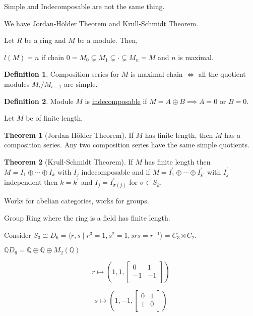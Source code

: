 \documentclass{article}
\theoremstyle{definition}
\newtheorem*{definition}{Definition}
\newtheorem{theorem}{Theorem}
\begin{document}
Simple and Indecomposable are not the same thing.

We have \underline{Jordan-H\"older Theorem} and \underline{Krull-Schmidt Theorem}.

Let \(R\) be a ring and \(M\) be a module. Then,

\(l(M) = n\) if chain \(0 = M_0 \subsetneq M_1 \subsetneq \cdot \subsetneq M_n = M\) and \(n\) is maximal.

\begin{definition}
    Composition series for \(M\) is maximal chain \(\iff\) all the quotient modules \(M_i / M_{i-1}\) are simple.
\end{definition}

\begin{definition}
    Module \(M\) is \underline{indecomposable} if \(M = A \oplus B\implies A = 0\) or \(B = 0\).
\end{definition}

Let \(M\) be of finite length. 

\begin{theorem}
    [Jordan-H\"older Theorem] If \(M\) has finite length, then \(M\) has a composition series. Any two composition series have the same simple quotients.
\end{theorem}

\begin{theorem}
    [Krull-Schmidt Theorem] If \(M\) has finite length then \(M = I_1 \oplus \cdots \oplus I_k\) with \(I_j\) indecomposable and if \(M = I_1^{\prime} \oplus \cdots \oplus I_{k^{\prime}}^{\prime} \) with \(I_j^{\prime}\) independent then \(k = k^{\prime}\) and \(I_j = I^{\prime}_{\sigma(j)}\) for \(\sigma \in S_k\).
\end{theorem}

Works for abelian categories, works for groups.

Group Ring where the ring is a field has finite length.

Consider \(S_3 \cong D_6 = \langle r, s \mid r^3 = 1, s^2 = 1, s r s = r ^{-1} \rangle = C_3 \rtimes C_2\).

\(\mathbb{Q}D_6 = \mathbb{Q} \oplus \mathbb{Q} \oplus M_2(\mathbb{Q})\)

\[
    r \mapsto \left( 1, 1, \begin{bmatrix}
        0 &  1 \\
        -1 &  -1 \\
    \end{bmatrix} \right) 
\]

\[
    s \mapsto \left( 1, -1, \begin{bmatrix}
        0 &  1 \\
        1 &  0 \\
    \end{bmatrix} \right) 
\]
\end{document}
